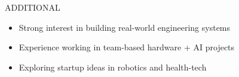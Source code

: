 \documentclass{resume}
\begin{document}

\begin{rSection}{ADDITIONAL}

\begin{itemize}
    \item Strong interest in building real-world engineering systems
    \item Experience working in team-based hardware + AI projects
    \item Exploring startup ideas in robotics and health-tech
\end{itemize}

\end{rSection}
\end{document}
